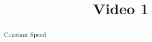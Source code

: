 \documentclass[handout]{ximera}
\title{Video 1}
\begin{document}
\begin{abstract}
Constant Speed
\end{abstract}

\maketitle

\end{document}
